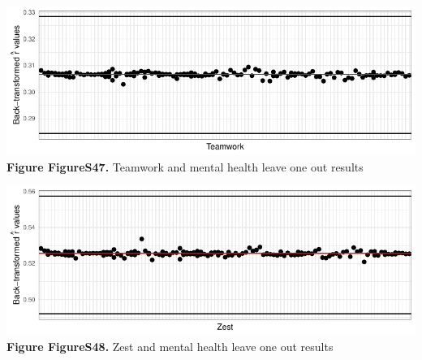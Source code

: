 \documentclass[
  letterpaper,
  DIV=11,
  numbers=noendperiod]{scrartcl}
\begin{document}
\includegraphics{SupplementaryResults_files/figure-pdf/unnamed-chunk-12-23.pdf}\textbf{Figure
FigureS47.} Teamwork and mental health leave one out results

\includegraphics{SupplementaryResults_files/figure-pdf/unnamed-chunk-12-24.pdf}\textbf{Figure
FigureS48.} Zest and mental health leave one out results
\end{document}
